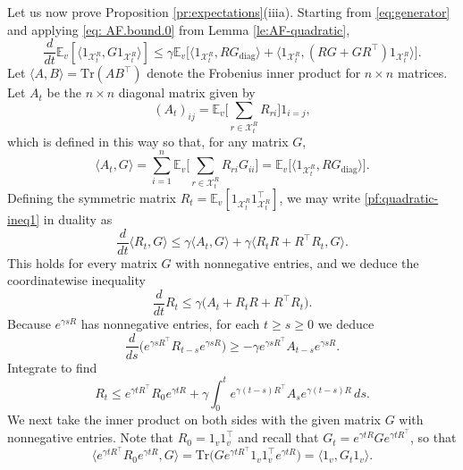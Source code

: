 \documentclass[11pt,reqno]{amsart}
\numberwithin{equation}{section}
\theoremstyle{definition}
\def\E{{\mathbb E}}
\def\tr{{\mathrm{Tr}}}
\def\X{{\mathcal X}}
\begin{document}
Let us now prove Proposition \ref{pr:expectations}(iiia). Starting from \eqref{eq:generator} and applying \eqref{eq: AF.bound.0} from Lemma \ref{le:AF-quadratic},
\begin{equation}
\frac{d}{dt} \E_v[\langle 1_{\X^{R}_t},G1_{\X^{R}_t}\rangle ] \le \gamma \E_v\big[\langle 1_{\X^{R}_t}, R G_{\mathrm{diag}}\rangle + \langle 1_{\X^{R}_t}, (R G+ GR^\top)1_{\X^{R}_t}\rangle \big]. \label{pf:quadratic-ineq1}
\end{equation}
Let $\langle A,B\rangle = \tr(AB^\top)$ denote the Frobenius inner product for $n \times n$ matrices.
Let $A_t$ be the $n \times n$ diagonal matrix given by
\begin{equation*}
(A_t)_{ij} = \E_v\bigg[\sum_{r \in \X^{R}_t}R_{ri}\bigg]1_{i = j},
\end{equation*}
which is defined in this way so that, for any matrix $G$,
\begin{equation*}
\langle A_t, G\rangle = \sum_{i=1}^n \E_v\bigg[\sum_{r \in \X^{R}_t}R_{ri}G_{ii}\bigg] = \E_v\big[ \langle 1_{\X^{R}_t},R G_{\mathrm{diag}}\rangle \big].
\end{equation*}
Defining the symmetric matrix $R_t = \E_v[1_{\X^{R}_t}1_{\X^{R}_t}^\top]$, we may write \eqref{pf:quadratic-ineq1} in duality as
\begin{equation*}
\frac{d}{dt}\langle R_t,G\rangle \le \gamma \langle A_t,G\rangle + \gamma \langle R_tR  +R^\top R_t, G \rangle.
\end{equation*}
This holds for every matrix $G$ with nonnegative entries, and we deduce the coordinatewise inequality
\begin{equation*}
\frac{d}{dt}R_t \le \gamma\big( A_t + R_tR + R^\top R_t\big).
\end{equation*}
Because $e^{\gamma s R}$ has nonnegative entries, for each $t \ge s \ge 0$ we deduce
\begin{equation*}
\frac{d}{ds}\big(e^{\gamma sR^\top}R_{t-s} e^{\gamma sR} \big) \ge -\gamma e^{\gamma sR^\top}A_{t-s} e^{\gamma sR} .
\end{equation*}
Integrate to find
\begin{equation}
 R_t \le e^{\gamma tR^\top}R_0 e^{\gamma tR} + \gamma \int_0^t e^{\gamma (t-s)R^\top}A_s e^{\gamma (t-s)R} \,ds. \label{pf:ineq-quadratic2}
\end{equation}
We next take the inner product on both sides with the given matrix $G$ with nonnegative entries.
Note that $R_0=1_v1_v^\top$ and recall that $G_t = e^{\gamma tR}Ge^{\gamma  tR^\top}$, so that
\begin{equation*}
\langle e^{\gamma tR^\top}R_0 e^{\gamma tR},G\rangle = \tr\big(Ge^{\gamma tR^\top}1_v1_v^\top e^{\gamma tR}\big) = \langle 1_v, G_t 1_v\rangle.
\end{equation*} 
\end{document}

